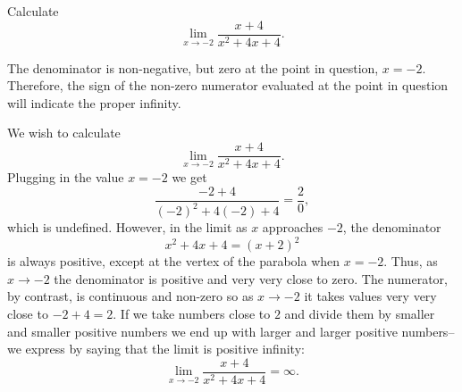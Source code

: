 \documentclass{ximera}
\author{Emma Smith Zbarsky}
\begin{document}
\begin{exercise}

Calculate \[\lim_{x\to -2} \frac{x+4}{x^2+4x+4}.\]


\begin{hint}
The denominator is non-negative, but zero at the point in question,
$x=-2$. Therefore, the sign of the non-zero numerator evaluated at the
point in question will indicate the proper infinity.
\end{hint}


\begin{hint}
We wish to calculate \[\lim_{x\to -2} \frac{x+4}{x^2+4x+4}.\] Plugging
in the value $x=-2$ we get
\[\frac{-2+4}{(-2)^2+4(-2)+4} = \frac{2}{0},\] which is undefined.
However, in the limit as $x$ approaches $-2$, the denominator
\[x^2+4x+4 = (x+2)^2\] is always positive, except at the vertex of the
parabola when $x=-2$. Thus, as $x \to -2$ the denominator is positive
and very very close to zero. The numerator, by contrast, is continuous
and non-zero so as $x\to -2$ it takes values very very close to
$-2+4=2$. If we take numbers close to $2$ and divide them by smaller and
smaller positive numbers we end up with larger and larger positive
numbers--we express by saying that the limit is positive infinity:
\[\lim_{x\to -2} \frac{x+4}{x^2+4x+4} = \infty.\]
\end{hint}


\begin{multipleChoice}
\choice{$-\infty$}
\choice[correct]{$\infty$}
\end{multipleChoice}

\end{exercise}
\end{document}
